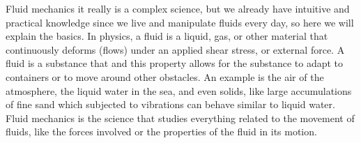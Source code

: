 
Fluid mechanics 
it really is a complex science, but we already have intuitive and practical knowledge since we live and manipulate fluids every day, so here we will
explain the basics.
In physics, a fluid is a liquid, gas, or other material that continuously deforms (flows) under an applied shear stress, or external force.
A fluid is a substance that  and this property allows for the substance to adapt to containers or to move around other obstacles. An example is the air of the atmosphere, the liquid water in the sea, and even solids, like large accumulations of fine sand which subjected to vibrations can behave similar to liquid water.
Fluid mechanics is the science that studies everything related to the movement of fluids, like the forces involved or the properties of the fluid in its motion.

